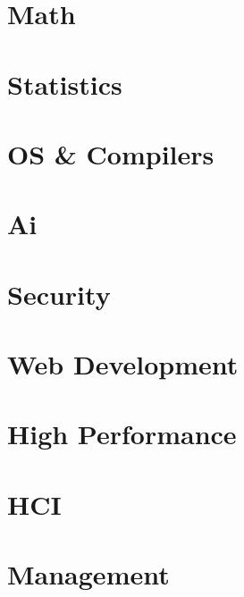 \section{Math}
\hypertarget{cat:math}{}












\section{Statistics}
\hypertarget{cat:stat}{}


\section{OS \& Compilers}
\hypertarget{cat:os}{}



\section{Ai}
\hypertarget{cat:ai}{}



\section{Security}
\hypertarget{cat:security}{}



\section{Web Development}
\hypertarget{cat:web}{}





\section{High Performance}
\hypertarget{cat:hp}{}





\section{HCI}
\hypertarget{cat:hci}{}




\section{Management}
\hypertarget{cat:management}{}


